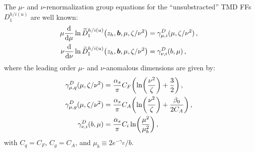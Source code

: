 \documentclass[a4paper, 11 pt]{article}
\begin{document}
The $\mu$- and $\nu$-renormalization group equations for the ``unsubstracted'' TMD FFs $D_1^{h/i(u)}$ are well known:
\begin{align}
\mu \frac{\dd{}}{\dd{\mu}} \ln \widetilde{D}_1^{h/i(u)} \pqty{z_h, \boldsymbol{b}, \mu, \zeta/\nu^2}
& =
\gamma_{\mu, i}^D(\mu, \zeta/\nu^2)
\, , \\
\nu \frac{\dd{}}{\dd{\nu}} \ln \widetilde{D}_1^{h/i(u)} \pqty{z_h, \boldsymbol{b}, \mu, \zeta/\nu^2}
& =
\gamma_{\nu, i}^D(b, \mu)
\, ,
\end{align}
where the leading order $\mu$- and $\nu$-anomalous dimensions are given by:
\begin{align}
\gamma_{\mu, q}^D(\mu, \zeta/\nu^2)
& =
\frac{\alpha_s}{\pi} C_F \pqty{\ln(\frac{\nu^2}{\zeta}) + \frac{3}{2}}
\, , \\
\gamma_{\mu, g}^D(\mu, \zeta/\nu^2)
& =
\frac{\alpha_s}{\pi} C_A \pqty{\ln(\frac{\nu^2}{\zeta}) + \frac{\beta_0}{2C_A}}
\, , \\
\gamma_{\nu, i}^D(b,\mu)
& =
\frac{\alpha_s}{\pi} C_i \ln(\frac{\mu^2}{\mu_b^2})
\, , \label{e.gamma_nu_q}
\end{align}
with $C_q = C_F$, $C_g = C_A$, and $\mu _b \equiv 2 e^{- \gamma _E} / b$.
\end{document}
